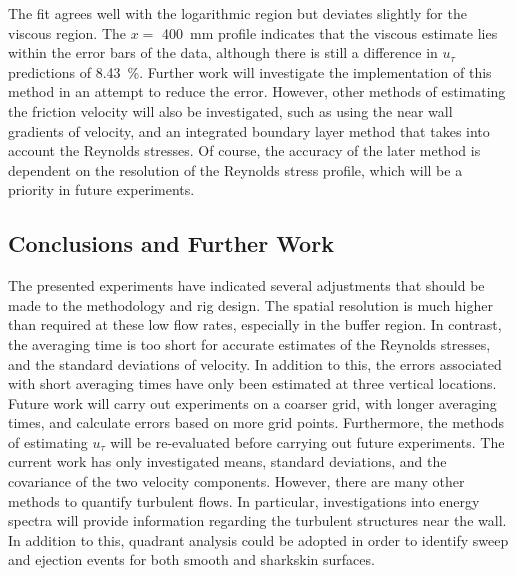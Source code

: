 \documentclass[12pt,oneside,a4paper]{article}
\begin{document}
%
The fit agrees well with the logarithmic region but deviates slightly for the viscous region. The $x=$ \SI{400}{mm} profile indicates that the viscous estimate lies within the error bars of the data, although there is still a difference in $u_\tau$ predictions of \SI{8.43}{\%}. Further work will investigate the implementation of this method in an attempt to reduce the error. However, other methods of estimating the friction velocity will also be investigated, such as using the near wall gradients of velocity, and an integrated boundary layer method that takes into account the Reynolds stresses. Of course, the accuracy of the later method is dependent on the resolution of the Reynolds stress profile, which will be a priority in future experiments. 

\subsection{Conclusions and Further Work}
The presented experiments have indicated several adjustments that should be made to the methodology and rig design. The spatial resolution is much higher than required at these low flow rates, especially in the buffer region. In contrast, the averaging time is too short for accurate estimates of the Reynolds stresses, and the standard deviations of velocity. In addition to this, the errors associated with short averaging times have only been estimated at three vertical locations. Future work will carry out experiments on a coarser grid, with longer averaging times, and calculate errors based on more grid points. Furthermore, the methods of estimating $u_\tau$ will be re-evaluated before carrying out future experiments. The current work has only investigated means, standard deviations, and the covariance of the two velocity components. However, there are many other methods to quantify turbulent flows. In particular, investigations into energy spectra will provide information regarding the turbulent structures near the wall. In addition to this, quadrant analysis could be adopted in order to identify sweep and ejection events for both smooth and sharkskin surfaces.
\end{document}
